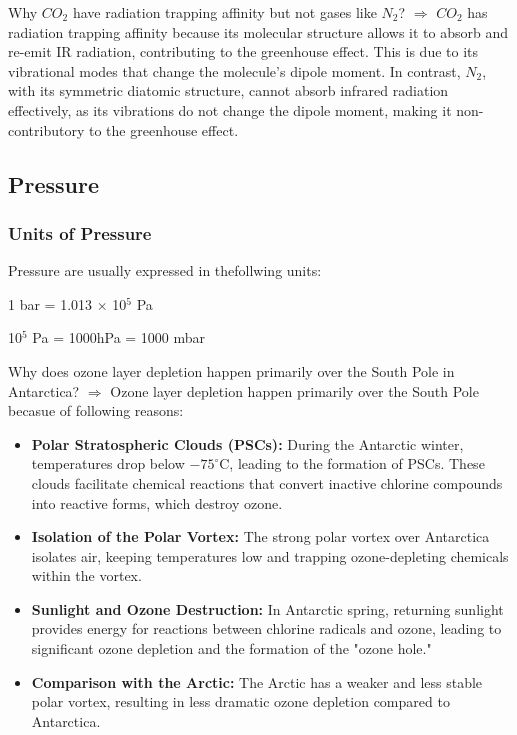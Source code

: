 \documentclass[fleqn,10pt]{SelfArx} %
\begin{document}
 \begin{question}[label={q:4.2}]{Why $CO_2$ have radiation trapping affinity but not gases like $N_2$?}
    $\Rightarrow$ $CO_2$ has radiation trapping affinity because its molecular structure allows it to absorb and re-emit IR radiation, contributing to the greenhouse effect. This is due to its vibrational modes that change the molecule's dipole moment. In contrast, $N_2$, with its symmetric diatomic structure, cannot absorb infrared radiation effectively, as its vibrations do not change the dipole moment, making it non-contributory to the greenhouse effect.
\end{question}

\subsection{Pressure}
\subsubsection*{Units of Pressure}

Pressure are usually expressed in thefollwing units:

1 bar = 1.013 $\times$ 10$^5$ Pa 

10$^5$ Pa = 1000hPa = 1000 mbar

\begin{question}[label={q:4.3}]{Why does ozone layer depletion happen primarily over the South Pole in Antarctica?}
   $\Rightarrow$ Ozone layer depletion happen primarily over the South Pole becasue of following reasons: 
   \begin{itemize}
        \item \textbf{Polar Stratospheric Clouds (PSCs):} During the Antarctic winter, temperatures drop below $-75^\circ$C, leading to the formation of PSCs. These clouds facilitate chemical reactions that convert inactive chlorine compounds into reactive forms, which destroy ozone.

        \item \textbf{Isolation of the Polar Vortex:} The strong polar vortex over Antarctica isolates air, keeping temperatures low and trapping ozone-depleting chemicals within the vortex.

        \item \textbf{Sunlight and Ozone Destruction:} In Antarctic spring, returning sunlight provides energy for reactions between chlorine radicals and ozone, leading to significant ozone depletion and the formation of the "ozone hole."

        \item \textbf{Comparison with the Arctic:} The Arctic has a weaker and less stable polar vortex, resulting in less dramatic ozone depletion compared to Antarctica.
   \end{itemize}
\end{question}
\end{document}
